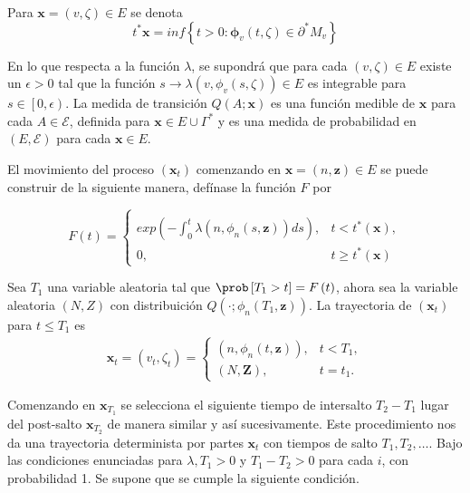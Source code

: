 Para $\mathbf{x}=\left(v,\zeta\right)\in E$ se denota
\[t^{*}\mathbf{x}=inf\left\{t>0:\mathbf{\phi}_{v}\left(t,\zeta\right)\in\partial^{*}M_{v}\right\}\]

En lo que respecta a la funci\'on $\lambda$, se supondr\'a que
para cada $\left(v,\zeta\right)\in E$ existe un $\epsilon>0$ tal
que la funci\'on
$s\rightarrow\lambda\left(v,\phi_{v}\left(s,\zeta\right)\right)\in
E$ es integrable para $s\in\left[0,\epsilon\right)$. La medida de
transici\'on $Q\left(A;\mathbf{x}\right)$ es una funci\'on medible
de $\mathbf{x}$ para cada $A\in\mathcal{E}$, definida para
$\mathbf{x}\in E\cup\Gamma^{*}$ y es una medida de probabilidad en
$\left(E,\mathcal{E}\right)$ para cada $\mathbf{x}\in E$.

El movimiento del proceso $\left(\mathbf{x}_{t}\right)$ comenzando
en $\mathbf{x}=\left(n,\mathbf{z}\right)\in E$ se puede construir
de la siguiente manera, def\'inase la funci\'on $F$ por

\begin{equation}
F\left(t\right)=\left\{\begin{array}{ll}\\
exp\left(-\int_{0}^{t}\lambda\left(n,\phi_{n}\left(s,\mathbf{z}\right)\right)ds\right), & t<t^{*}\left(\mathbf{x}\right),\\
0, & t\geq t^{*}\left(\mathbf{x}\right)
\end{array}\right.
\end{equation}

Sea $T_{1}$ una variable aleatoria tal que
$\prob\left[T_{1}>t\right]=F\left(t\right)$, ahora sea la variable
aleatoria $\left(N,Z\right)$ con distribuici\'on
$Q\left(\cdot;\phi_{n}\left(T_{1},\mathbf{z}\right)\right)$. La
trayectoria de $\left(\mathbf{x}_{t}\right)$ para $t\leq T_{1}$ es
\begin{eqnarray*}
\mathbf{x}_{t}=\left(v_{t},\zeta_{t}\right)=\left\{\begin{array}{ll}
\left(n,\phi_{n}\left(t,\mathbf{z}\right)\right), & t<T_{1},\\
\left(N,\mathbf{Z}\right), & t=t_{1}.
\end{array}\right.
\end{eqnarray*}

Comenzando en $\mathbf{x}_{T_{1}}$ se selecciona el siguiente
tiempo de intersalto $T_{2}-T_{1}$ lugar del post-salto
$\mathbf{x}_{T_{2}}$ de manera similar y as\'i sucesivamente. Este
procedimiento nos da una trayectoria determinista por partes
$\mathbf{x}_{t}$ con tiempos de salto $T_{1},T_{2},\ldots$. Bajo
las condiciones enunciadas para $\lambda,T_{1}>0$  y
$T_{1}-T_{2}>0$ para cada $i$, con probabilidad 1. Se supone que
se cumple la siguiente condici\'on.

